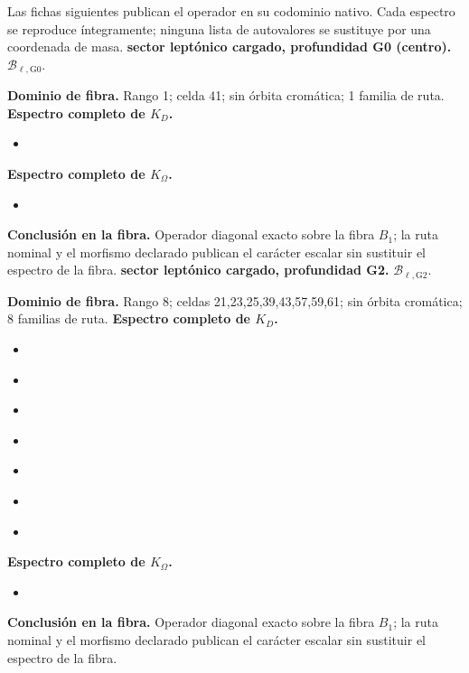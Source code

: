 \begingroup
\small
\setlength{\parskip}{.12\baselineskip}
\let\texttt\textnormal
Las fichas siguientes publican el operador en su codominio nativo. Cada espectro se reproduce íntegramente; ninguna lista de autovalores se sustituye por una coordenada de masa.
\noindent\textbf{sector leptónico cargado, profundidad G0 (centro).} \(\mathcal B_{\ell,\mathrm{G0}}\).\par
\noindent\textbf{Dominio de fibra.} Rango 1; celda 41; sin órbita cromática; 1 familia de ruta.
\noindent\textbf{Espectro completo de \(K_D\).}
\begin{itemize}
\item \texttt{}
\end{itemize}
\noindent\textbf{Espectro completo de \(K_\Omega\).}
\begin{itemize}
\item \texttt{}
\end{itemize}
\noindent\textbf{Conclusión en la fibra.} Operador diagonal exacto sobre la fibra \(B_1\); la ruta nominal y el morfismo declarado publican el carácter escalar sin sustituir el espectro de la fibra.
\medskip
{}
\noindent\textbf{sector leptónico cargado, profundidad G2.} \(\mathcal B_{\ell,\mathrm{G2}}\).\par
\noindent\textbf{Dominio de fibra.} Rango 8; celdas 21,23,25,39,43,57,59,61; sin órbita cromática; 8 familias de ruta.
\noindent\textbf{Espectro completo de \(K_D\).}
\begin{itemize}
\item \texttt{}
\item \texttt{}
\item \texttt{}
\item \texttt{}
\item \texttt{}
\item \texttt{}
\item \texttt{}
\end{itemize}
\noindent\textbf{Espectro completo de \(K_\Omega\).}
\begin{itemize}
\item \texttt{}
\end{itemize}
\noindent\textbf{Conclusión en la fibra.} Operador diagonal exacto sobre la fibra \(B_1\); la ruta nominal y el morfismo declarado publican el carácter escalar sin sustituir el espectro de la fibra.
